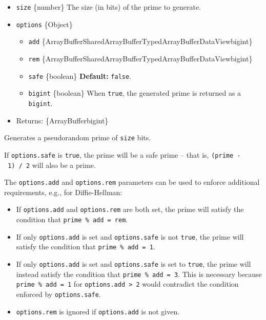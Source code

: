 \begin{itemize}
\tightlist
\item
  \texttt{size} \{number\} The size (in bits) of the prime to generate.
\item
  \texttt{options} \{Object\}

  \begin{itemize}
  \tightlist
  \item
    \texttt{add}
    \{ArrayBuffer\textbar SharedArrayBuffer\textbar TypedArray\textbar Buffer\textbar DataView\textbar bigint\}
  \item
    \texttt{rem}
    \{ArrayBuffer\textbar SharedArrayBuffer\textbar TypedArray\textbar Buffer\textbar DataView\textbar bigint\}
  \item
    \texttt{safe} \{boolean\} \textbf{Default:} \texttt{false}.
  \item
    \texttt{bigint} \{boolean\} When \texttt{true}, the generated prime
    is returned as a \texttt{bigint}.
  \end{itemize}
\item
  Returns: \{ArrayBuffer\textbar bigint\}
\end{itemize}

Generates a pseudorandom prime of \texttt{size} bits.

If \texttt{options.safe} is \texttt{true}, the prime will be a safe
prime -- that is, \texttt{(prime\ -\ 1)\ /\ 2} will also be a prime.

The \texttt{options.add} and \texttt{options.rem} parameters can be used
to enforce additional requirements, e.g., for Diffie-Hellman:

\begin{itemize}
\tightlist
\item
  If \texttt{options.add} and \texttt{options.rem} are both set, the
  prime will satisfy the condition that \texttt{prime\ \%\ add\ =\ rem}.
\item
  If only \texttt{options.add} is set and \texttt{options.safe} is not
  \texttt{true}, the prime will satisfy the condition that
  \texttt{prime\ \%\ add\ =\ 1}.
\item
  If only \texttt{options.add} is set and \texttt{options.safe} is set
  to \texttt{true}, the prime will instead satisfy the condition that
  \texttt{prime\ \%\ add\ =\ 3}. This is necessary because
  \texttt{prime\ \%\ add\ =\ 1} for
  \texttt{options.add\ \textgreater{}\ 2} would contradict the condition
  enforced by \texttt{options.safe}.
\item
  \texttt{options.rem} is ignored if \texttt{options.add} is not given.
\end{itemize}


